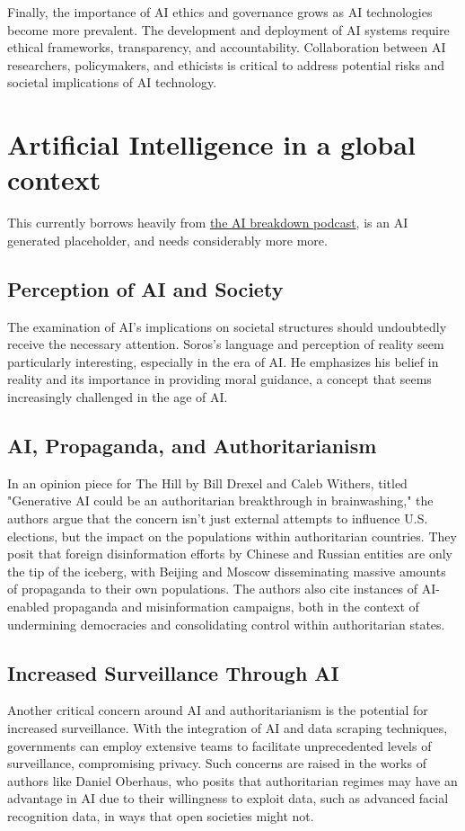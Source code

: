 Finally, the importance of AI ethics and governance grows as AI technologies become more prevalent. The development and deployment of AI systems require ethical frameworks, transparency, and accountability. Collaboration between AI researchers, policymakers, and ethicists is critical to address potential risks and societal implications of AI technology.

\section{Artificial Intelligence in a global context}

This currently borrows heavily from \href{https://www.youtube.com/watch?v=5clOHBo8HP8}{the AI breakdown podcast}, is an AI generated placeholder, and needs considerably more more.

\subsection{Perception of AI and Society}
The examination of AI's implications on societal structures should undoubtedly receive the necessary attention. Soros's language and perception of reality seem particularly interesting, especially in the era of AI. He emphasizes his belief in reality and its importance in providing moral guidance, a concept that seems increasingly challenged in the age of AI.

\subsection{AI, Propaganda, and Authoritarianism}
In an opinion piece for The Hill by Bill Drexel and Caleb Withers, titled "Generative AI could be an authoritarian breakthrough in brainwashing," the authors argue that the concern isn't just external attempts to influence U.S. elections, but the impact on the populations within authoritarian countries. They posit that foreign disinformation efforts by Chinese and Russian entities are only the tip of the iceberg, with Beijing and Moscow disseminating massive amounts of propaganda to their own populations. The authors also cite instances of AI-enabled propaganda and misinformation campaigns, both in the context of undermining democracies and consolidating control within authoritarian states.

\subsection{Increased Surveillance Through AI}
Another critical concern around AI and authoritarianism is the potential for increased surveillance. With the integration of AI and data scraping techniques, governments can employ extensive teams to facilitate unprecedented levels of surveillance, compromising privacy. Such concerns are raised in the works of authors like Daniel Oberhaus, who posits that authoritarian regimes may have an advantage in AI due to their willingness to exploit data, such as advanced facial recognition data, in ways that open societies might not.

